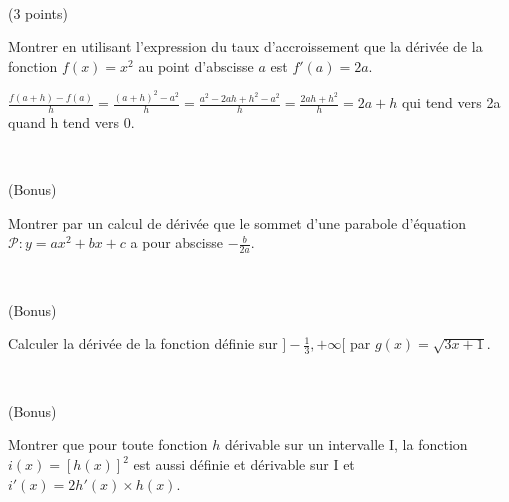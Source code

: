 \documentclass[a4paper,11pt]{article}
\theoremstyle{break}
\begin{document}
~
      \vspace{0.5cm}
      
\begin{exo}(3 points)
~
      \vspace{0.25cm}
      
  Montrer en utilisant l'expression du taux d'accroissement que la dérivée de la fonction  $f(x)=x^2$ au point d'abscisse $a$ est $f'(a)=2a$.
\end{exo}

\begin{correction}
 $\frac{f(a+h)-f(a)}{h}=\frac{(a+h)^2-a^2}{h}=\frac{a^2-2ah+h^2-a^2}{h}=\frac{2ah+h^2}{h}=2a+h$ qui tend vers 2a quand h tend vers 0.
\end{correction}
~
      \vspace{0.5cm}

\begin{exo}(Bonus)
~
      \vspace{0.25cm}
      
 Montrer par un calcul de dérivée que le sommet d'une parabole d'équation $\mathcal{P}:y=ax^2+bx+c$ a pour abscisse $-\frac{b}{2a}$.
\end{exo}

~
      \vspace{0.5cm}

\begin{exo}(Bonus)
  
 Calculer la dérivée de la fonction définie sur $]-\frac{1}{3},+\infty[$ par $g(x)=\sqrt{3x+1}$.
\end{exo}
  
      ~
  \vspace{0.5cm}
  
\begin{exo}(Bonus)
    ~
  \vspace{0.5cm}
  
    Montrer que pour toute fonction $h$ dérivable sur un intervalle I, la fonction $i(x)=[h(x)]^2$
  est aussi définie et dérivable sur I et $i'(x)=2 h'(x) \times h(x)$.
 
\end{exo}
\end{document}
